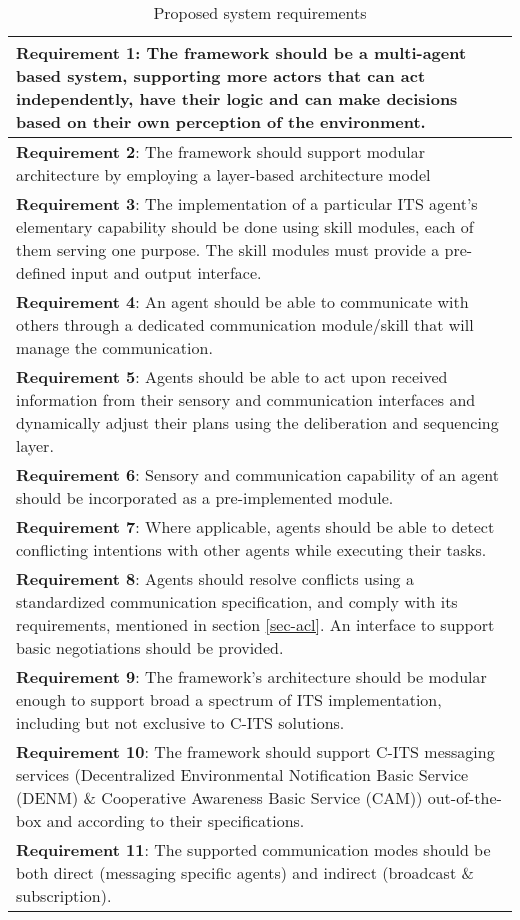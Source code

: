 \documentclass[main.tex]{subfiles}
\begin{document}
\begin{table}[htbp]
    \small
    \caption{Proposed system requirements}
    \centering\begin{tabular}{>{\footnotesize}p{}}
        \toprule 
\textbf{Requirement 1}: The framework should be a multi-agent based system, supporting more actors 
that can act independently, have their logic and can make decisions based on their 
own perception of the environment.
\\ \midrule
\textbf{Requirement 2}: The framework should support modular architecture by employing a layer-based 
architecture model
\\ \midrule
\textbf{Requirement 3}: The implementation of a particular ITS agent's elementary
capability should be done using skill modules, each of them serving one purpose. The skill modules must provide a
pre-defined input and output interface.
\\ \midrule
\textbf{Requirement 4}: An agent should be able to communicate with others through a dedicated communication module/skill 
that will manage the communication.
\\ \midrule
\textbf{Requirement 5}: Agents should be able to act upon received information from their sensory and communication interfaces
and dynamically adjust their plans using the deliberation and sequencing layer.
\\ \midrule
\textbf{Requirement 6}: Sensory and communication capability of an agent should be incorporated 
as a pre-implemented module.
\\ \midrule
\textbf{Requirement 7}: Where applicable, agents should be able to detect conflicting intentions with other agents
while executing their tasks. 
\\ \midrule
\textbf{Requirement 8}: Agents should resolve conflicts using a standardized communication
specification, and comply with its requirements, mentioned in section \ref{sec-acl}. An
interface to support basic negotiations should be provided.
\\ \midrule
\textbf{Requirement 9}: The framework's architecture should be modular enough to support broad 
a spectrum of ITS implementation, including but not exclusive to C-ITS solutions.
\\ \midrule
\textbf{Requirement 10}: The framework should support C-ITS messaging services (Decentralized
Environmental Notification Basic Service (DENM) \& Cooperative Awareness Basic Service (CAM))
out-of-the-box and according to their specifications.
\\ \midrule
\textbf{Requirement 11}: The supported communication modes should be both direct (messaging specific agents) and indirect  
(broadcast \& subscription). 
\\ \bottomrule
    \end{tabular}
    \label{sys-requirements}
\end{table}

\clearpage
\end{document}

